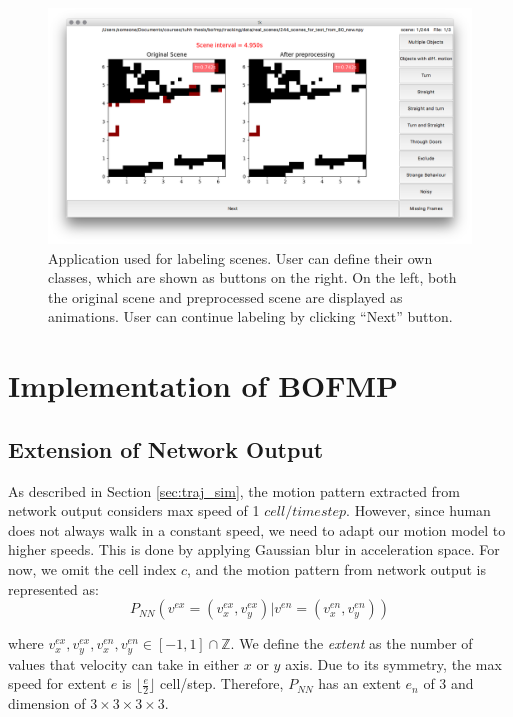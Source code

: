  \begin{figure}[H]
\centering
\includegraphics[width=.9\textwidth]{figures/application_1.png}
\caption[Application used for labeling scenes.]{Application used for labeling scenes. User can define their own classes, which are shown as buttons on the right. On the left, both the original scene and preprocessed scene are displayed as animations. User can continue labeling by clicking ``Next'' button.} 
\label{fig:application}
\end{figure}

\section{Implementation of BOFMP} \label{sec:BOFMP_implementation}

\subsection{Extension of Network Output} \label{sec:mm_ext}

As described in Section \ref{sec:traj_sim}, the motion pattern extracted from network output considers max speed of 1 $cell/timestep$. However, since human does not always walk in a constant speed, we need to adapt our motion model to higher speeds. This is done by applying Gaussian blur in acceleration space. For now, we omit the cell index $c$, and the motion pattern from network output is represented as:
\begin{equation}
P_{NN}(v^{ex}=(v^{ex}_x, v^{ex}_y)|v^{en}=(v^{en}_x, v^{en}_y)) \label{eq:mm_1}
\end{equation}

where $v^{ex}_x, v^{ex}_y,v^{en}_x, v^{en}_y \in [-1, 1] \cap \mathbb{Z}$. We define the \textit{extent} as the number of values that velocity can take in either $x$ or $y$ axis. Due to its symmetry, the max speed for extent $e$ is $\lfloor \frac{e}{2} \rfloor$ cell/step. Therefore, $P_{NN}$ has an extent $e_{n}$ of 3 and dimension of $3 \times 3 \times 3 \times 3$. 

